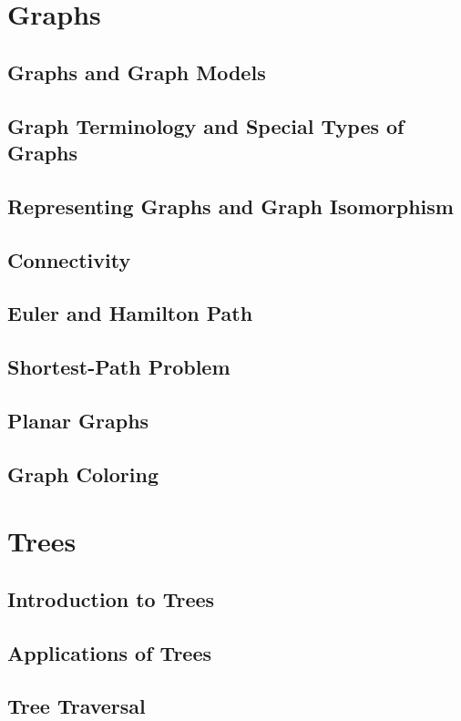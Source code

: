 \documentclass{article}
\begin{document}
\section{Graphs}

\subsection{Graphs and Graph Models}
\subsection{Graph Terminology and Special Types of Graphs}
\subsection{Representing Graphs and Graph Isomorphism}
\subsection{Connectivity}
\subsection{Euler and Hamilton Path}
\subsection{Shortest-Path Problem}
\subsection{Planar Graphs}
\subsection{Graph Coloring}

\section{Trees}

\subsection{Introduction to Trees}
\subsection{Applications of Trees }
\subsection{Tree Traversal }
\end{document}
